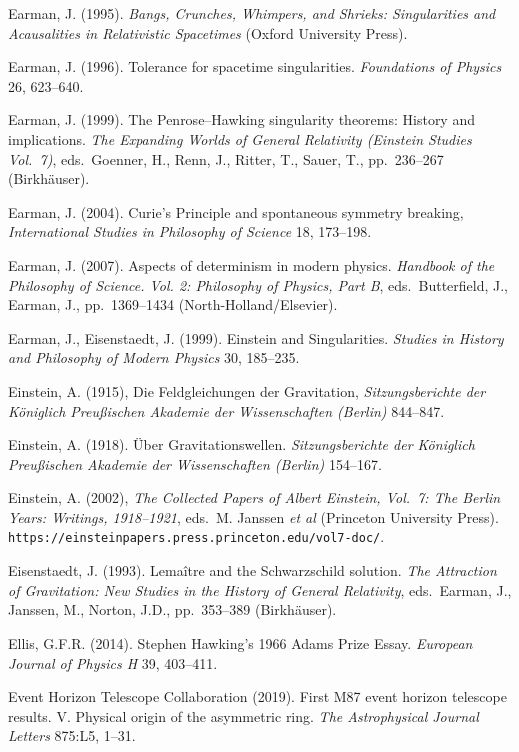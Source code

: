 \documentclass[11pt,a4paper]{article}
\begin{document}
\begin{small}
\begin{thebibliography}{99}
\item[]  Earman, J. (1995).  \emph{Bangs, Crunches, Whimpers, and Shrieks: Singularities and Acausalities in Relativistic Spacetimes} (Oxford University Press).
\item[]  Earman, J. (1996). Tolerance for spacetime singularities. \emph{Foundations of Physics} 26, 623--640.
\item[] Earman, J. (1999). The Penrose--Hawking singularity theorems: History and implications. \emph{The Expanding Worlds of General Relativity (Einstein Studies Vol.\ 7)}, eds.\ Goenner, H., Renn, J., Ritter, T., Sauer, T., pp.\ 236--267
(Birkh\"{a}user). 
\item[]  Earman, J. (2004). Curie's Principle and spontaneous symmetry breaking, \emph{International Studies in  Philosophy of Science} 18, 173--198. 
\item[]  Earman, J. (2007). Aspects of determinism in modern physics.  \emph{Handbook of
the Philosophy of Science. Vol. 2: Philosophy of Physics, Part B}, eds.\   Butterfield, J., Earman, J.,
 pp.\ 1369--1434 (North-Holland/Elsevier).
\item[] Earman, J.,  Eisenstaedt, J. (1999). Einstein and Singularities. \emph{Studies in History and Philosophy of Modern Physics} 30, 185--235.
\item[] Einstein, A. (1915), Die Feldgleichungen der Gravitation,
\emph{Sitzungsberichte der K\"{o}niglich Preu\ss ischen Akademie der Wissenschaften (Berlin)} 844--847.
\item[] Einstein, A. (1918). \"{U}ber Gravitationswellen. \emph{Sitzungsberichte der K\"{o}niglich Preu\ss ischen Akademie der Wissenschaften (Berlin)} 154--167.
\item[] Einstein, A. (2002),   \emph{The Collected Papers of Albert Einstein, Vol.\ 7: The Berlin Years: Writings, 1918--1921},
eds.\ M. Janssen \emph{et al} (Princeton University Press). 
\\  \verb#https://einsteinpapers.press.princeton.edu/vol7-doc/#. 
\item[]  Eisenstaedt, J. (1993).  Lema\^{i}tre and the Schwarzschild solution.
\emph{The Attraction of Gravitation: New Studies in the History of General Relativity}, eds.\
Earman, J.,  Janssen, M.,  Norton, J.D., pp.\ 353--389  (Birkh\"{a}user). 
\item[]  Ellis, G.F.R. (2014). Stephen Hawking's 1966 Adams Prize Essay.  \emph{European Journal of Physics H} 
39, 403--411. 
        \item[] Event Horizon Telescope Collaboration (2019). First M87 event horizon telescope results. V. Physical origin of the asymmetric ring. \emph{The Astrophysical Journal Letters} 875:L5, 1--31.

\end{thebibliography}
\end{small}
\end{document}
